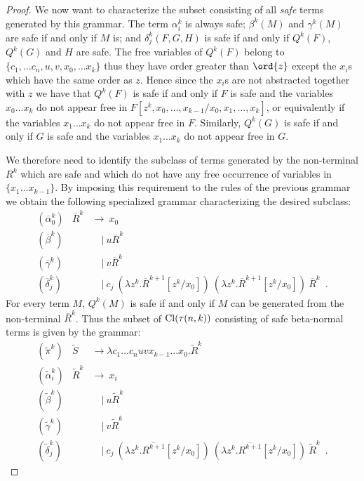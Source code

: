 \begin{proof}
We now want to characterize the subset consisting of all \emph{safe}
terms generated by this grammar. The term $\alpha_i^k$ is always
safe; $\beta^k(M)$ and $\gamma^k(M)$ are safe if and only if $M$ is;
and  $\delta^k_j(F,G,H)$ is safe if and only if $Q^k(F)$, $Q^k(G)$
and $H$ are safe. The free variables of $Q^k(F)$
belong to $\{ c_1, \ldots c_n, u, v, x_0,\ldots x_{k}\}$ thus they have order greater than $\ord{z}$ except the $x_i$s which have the same order as $z$. Hence since the $x_i$s are not abstracted together with $z$ we have that $Q^k(F)$ is safe if and only if $F$
is safe and the variables $x_0\ldots x_k$ do not appear free in
$F[z^k,x_0,\ldots, x_{k-1}/x_0,x_1, \ldots, x_k]$, or equivalently if the variables $x_1\ldots x_k$ do not appear free in $F$. Similarly, $Q^k(G)$ is safe if and only if $G$ is safe and
the variables $x_1\ldots x_k$ do not appear free in $G$.

We therefore need to identify the subclass of terms generated by the non-terminal $R^k$ which are safe and which do not have any free occurrence of variables in $\{x_1 \ldots x_{k-1}\}$. By imposing this requirement to the rules of the previous grammar we obtain the following specialized grammar characterizing the desired subclass:
\begin{eqnarray*}
  (\overline\alpha_0^k) &\overline R^k &\rightarrow\ x_0 \\
  (\overline\beta^k) && \quad|\  u \overline R^k \\
  (\overline\gamma^k) && \quad|\  v \overline R^k  \\
  (\overline\delta^k_j) && \quad|\  c_j\ (\lambda z^k. \overline R^{k+1}[z^k/x_0]) \ (\lambda z^k. \overline R^{k+1} [z^k/x_0]) \ \overline R^k \enspace .
\end{eqnarray*}
For every term $M$, $Q^k(M)$ is safe if and only if $M$ can be
generated from the non-terminal $\overline R^k$. Thus the subset of
${\rm Cl}(\tau(n,k))$ consisting of safe beta-normal terms is given
by the grammar:
\begin{eqnarray*}
  (\widetilde\pi^k) &\widetilde S &\rightarrow \lambda c_1 \ldots c_n u v x_{k-1} \ldots x_0 . \widetilde R^k \\
  (\widetilde\alpha_i^k) &\widetilde R^k &\rightarrow\ x_i \\
  (\widetilde\beta^k) && \quad|\  u \widetilde R^k \\
  (\widetilde\gamma^k) && \quad|\  v \widetilde R^k \\
  (\widetilde\delta^k_j) && \quad|\  c_j\ (\lambda z^k. \overline{R^{k+1}}[z^k/x_0]) \ (\lambda z^k. \overline{R^{k+1}}[z^k/x_0]) \ \widetilde R^k \enspace .
\end{eqnarray*}


\end{proof}
